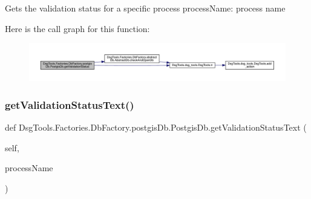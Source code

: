 \begin{DoxyVerb}Gets the validation status for a specific process
processName: process name
\end{DoxyVerb}
 Here is the call graph for this function\+:
\nopagebreak
\begin{figure}[H]
\begin{center}
\leavevmode
\includegraphics[width=350pt]{class_dsg_tools_1_1_factories_1_1_db_factory_1_1postgis_db_1_1_postgis_db_ae9935f758bccefcd0b740343ac2b16a8_cgraph}
\end{center}
\end{figure}
\mbox{\label{class_dsg_tools_1_1_factories_1_1_db_factory_1_1postgis_db_1_1_postgis_db_a82dcb02ab6375562fa7b576df97ef964}} 
\subsubsection{\texorpdfstring{get\+Validation\+Status\+Text()}{getValidationStatusText()}}
{\footnotesize\ttfamily def Dsg\+Tools.\+Factories.\+Db\+Factory.\+postgis\+Db.\+Postgis\+Db.\+get\+Validation\+Status\+Text (\begin{DoxyParamCaption}\item[{}]{self,  }\item[{}]{process\+Name }\end{DoxyParamCaption})}

